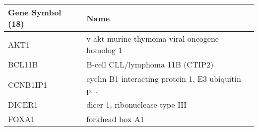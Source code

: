 \begin{tabular}{ll}
\toprule
Gene Symbol (18) &                                               Name \\
\midrule
            AKT1 &      v-akt murine thymoma viral oncogene homolog 1 \\
          BCL11B &                   B-cell CLL/lymphoma 11B  (CTIP2) \\
        CCNB1IP1 & cyclin B1 interacting protein 1, E3 ubiquitin p... \\
          DICER1 &                     dicer 1, ribonuclease type III \\
           FOXA1 &                                    forkhead box A1 \\
\bottomrule
\end{tabular}
